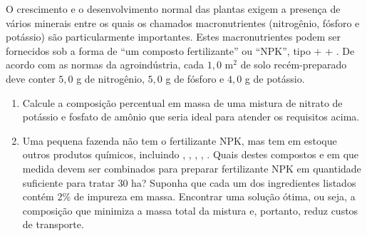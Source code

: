 O crescimento e o desenvolvimento normal das plantas exigem a presença
de vários minerais entre os quais os chamados macronutrientes (nitrogênio,
fósforo e potássio) são particularmente importantes. Estes macronutrientes
podem ser fornecidos sob a forma de “um composto fertilizante” ou “NPK”, tipo
 +  + .
De acordo com as normas da agroindústria, cada $1,0$ m$^2$ de solo recém-preparado deve conter $5,0$ g de nitrogênio, $5,0$ g de fósforo e $4,0$ g de potássio.

\begin{enumerate}[label = (\scalealph{\alph*})]
	\item Calcule a composição percentual em massa de uma mistura de nitrato de potássio e fosfato de amônio que seria ideal para atender os requisitos acima.
	\item Uma pequena fazenda não tem o fertilizante NPK, mas tem em estoque outros produtos químicos, incluindo , , , , .
		Quais destes compostos e em que medida devem ser combinados para preparar fertilizante NPK em quantidade suficiente para tratar $30$ ha?
		Suponha que cada um dos ingredientes listados contém 2\% de impureza em massa.
		Encontrar uma solução ótima, ou seja, a composição que minimiza a massa total da mistura e, portanto, reduz custos de transporte.
\end{enumerate}

